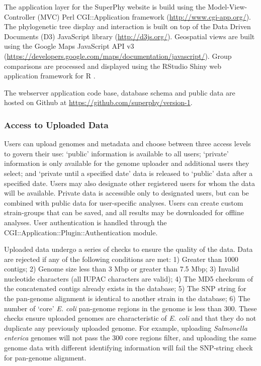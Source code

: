 \documentclass[doublespacing, linenumbers]{bmcart}
\begin{document}
The application layer for the SuperPhy website is build using the Model-View-Controller (MVC) Perl CGI::Application framework (\url{http://www.cgi-app.org/}). The phylogenetic tree display and interaction is built on top of the Data Driven Documents (D3) JavaScript library (\url{http://d3js.org/}). Geospatial views are built using the Google Maps JavaScript API v3 (\url{https://developers.google.com/maps/documentation/javascript/}). Group comparisons are processed and displayed using the RStudio Shiny web application framework for R \cite{racine_rstudio:_2012}.

The webserver application code base, database schema and public data are hosted on Github at \url{https://github.com/superphy/version-1}.

\subsubsection{Access to Uploaded Data}
Users can upload genomes and metadata and choose between three access levels to govern their use: `public' information is available to all users; `private' information is only available for the genome uploader and additional users they select; and `private until a specified date' data is released to `public' data after a specified date. Users may also designate other registered users for whom the data will be available. Private data is accessible only to designated users, but can be combined with public data for user-specific analyses. Users can create custom strain-groups that can be saved, and all results may be downloaded for offline analyses. User authentication is handled through the CGI::Application::Plugin::Authentication module.

Uploaded data undergo a series of checks to ensure the quality of the data. Data are rejected if any of the following conditions are met: 1) Greater than 1000 contigs; 2) Genome size less than 3 Mbp or greater than 7.5 Mbp; 3) Invalid nucleotide characters (all IUPAC characters are valid); 4) The MD5 checksum of the concatenated contigs already exists in the database; 5) The SNP string for the pan-genome alignment is identical to another strain in the database; 6) The number of `core' \textit{E. coli} pan-genome regions in the genome is less than 300. These checks ensure uploaded genomes are characteristic of \textit{E. coli} and that they do not duplicate any previously uploaded genome. For example, uploading \textit{Salmonella enterica} genomes will not pass the 300 core regions filter, and uploading the same genome data with different identifying information will fail the SNP-string check for pan-genome alignment.
\end{document}
